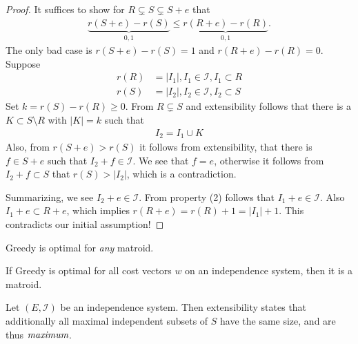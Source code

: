\begin{proof}
    It suffices to show for $R \subsetneq S \subsetneq S+e$ that
    \begin{align*}
        \underbrace{r(S+e) - r(S)}_{0,1} \leq \underbrace{r(R+e) - r(R)}_{0,1}.
    \end{align*}
    The only bad case is $r(S+e)-r(S)=1$ and $r(R+e)-r(R)=0$.
    Suppose
    \begin{align*}
        r(R) & = |I_1|, I_1 \in \mathcal{I}, I_1 \subset R \\
        r(S) & = |I_2|, I_2 \in \mathcal{I}, I_2 \subset S
    \end{align*}
    Set $k = r(S)-r(R) \geq 0$.
    From $R \subsetneq S$ and extensibility follows that
    there is a $K \subset S \setminus R$ with $|K|=k$ such that
    \begin{align*}
        I_2=I_1 \cup K
    \end{align*}
    Also, from $r(S+e) > r(S)$ it follows from extensibility, that there is $f \in S + e$ such that $I_2+f \in \mathcal{I}$.
    We see that $f=e$, otherwise it follows from $I_2+f \subset S$ that $r(S) > |I_2|$, which is a contradiction.

    Summarizing, we see $I_2+e \in \mathcal{I}$.
    From property (2) follows that $I_1+e \in \mathcal{I}$.
    Also $I_1 +e \subset R +e$, which implies $r(R+e)=r(R)+1=|I_1|+1$. This contradicts our initial assumption!
\end{proof}
\begin{corollary}
    Greedy is optimal for \emph{any} matroid.
\end{corollary}
\begin{theorem} \label{thm:greedy-ind-is-matroid}
    If Greedy is optimal for all cost vectors $w$ on an independence system, then it is a matroid.
\end{theorem}
Let $(E,\mathcal{I})$ be an independence system. Then extensibility states
that additionally all maximal independent subsets of $S$ have the same size, and are thus $\emph{maximum}$.
